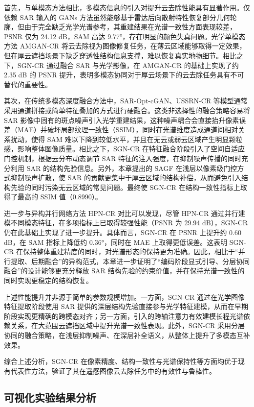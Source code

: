 首先，与单模态方法相比，多模态信息的引入对提升云去除性能具有显著作用。仅依赖 SAR 输入的 GANs 方法虽然能够基于雷达后向散射特性恢复部分几何轮廓，但由于完全缺乏光学光谱参考，其重建结果在光谱一致性方面表现较差，PSNR 仅为 24.12 dB，SAM 高达 9.77°，存在明显的颜色失真问题。光学单模态方法 AMGAN-CR 将云去除视为图像修复任务，在薄云区域能够取得一定效果，但在厚云遮挡场景下缺乏穿透性结构信息支撑，难以恢复真实地物细节。相比之下，SGN-CR 通过融合 SAR 与光学影像，在 AMGAN-CR 的基础上实现了约 2.35 dB 的 PSNR 提升，表明多模态协同对于厚云场景下的云去除任务具有不可替代的重要性。

其次，在传统多模态深度融合方法中，SAR-Opt-cGAN、USSRN-CR 等模型通常采用通道拼接或简单特征叠加的方式进行硬融合。这类非选择性的融合策略容易将 SAR 影像中固有的斑点噪声引入光学重建结果，这种噪声耦合会直接抬升像素误差（MAE）并破坏局部纹理一致性（SSIM），同时在光谱维度造成通道间相对关系扰动，使得 SAM 难以下降到较低水平，并且在无云或弱云区域产生明显颗粒感，影响整体图像质量。相比之下，SGN-CR 在特征融合阶段引入了空间自适应门控机制，根据云分布动态调节 SAR 特征的注入强度，在抑制噪声传播的同时充分利用 SAR 的结构先验信息。另外，本章提出的 SAGF 在浅层以像素级门控方式抑制噪声扩散，使 SAR 的贡献更集中于厚云区域的结构补偿，从而避免引入结构先验的同时污染无云区域的常见问题。最终使 SGN-CR 在结构一致性指标上取得了最高的 SSIM 值（0.8990）。

进一步与异构并行网络方法 HPN-CR 对比可以发现，尽管 HPN-CR 通过并行建模不同模态特征，在多项指标上已取得较强性能（PSNR 为 29.94 dB），SGN-CR 仍在此基础上实现了进一步提升。具体而言，SGN-CR 在 PSNR 上提升约 0.60 dB，在 SAM 指标上降低约 0.36°，同时在 MAE 上取得更低误差。这表明 SGN-CR 在保持整体重建精度的同时，对光谱形态的保持更为准确。因此，相比于“并行提取、后期融合”的异构范式，本章进一步证明了“编码阶段显式引导、分层协同融合”的设计能够更充分释放 SAR 结构先验的约束价值，并在保持光谱一致性的同时实现更稳定的结构恢复。

上述性能提升并非源于简单的参数规模增加。一方面，SGN-CR 通过在光学图像特征提取阶段使用 SAR 提供的深层结构先验直接参与光学特征建模，从而在早期阶段实现更精确的跨模态对齐；另一方面，引入的跨轴注意力有效建模长程光谱依赖关系，在大范围云遮挡区域中提升光谱一致性表现。此外，SGN-CR 采用分层协同的融合策略，在浅层抑制噪声、在深层补全语义，从整体上提升了多模态互补效果。

综合上述分析，SGN-CR 在像素精度、结构一致性与光谱保持性等方面均优于现有代表性方法，验证了其在遥感图像云去除任务中的有效性与鲁棒性。

\subsection{可视化实验结果分析}

